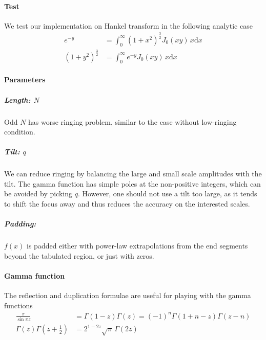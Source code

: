 \documentclass{article}
\renewcommand{\d}{\mathrm{d}}
\begin{document}
\paragraph{Test}
We test our implementation on Hankel transform in the following analytic case
\begin{align}
    e^{-y} &= \int_0^\infty (1+x^2)^\frac32 J_0(xy) \,x\d x  \\
    (1+y^2)^\frac32 &= \int_0^\infty e^{-y} J_0(xy) \,x\d x
\end{align}


\paragraph{Parameters}


\subparagraph{Length: $N$}
Odd $N$ has worse ringing problem, similar to the case without low-ringing condition.


\subparagraph{Tilt: $q$}
We can reduce ringing by balancing the large and small scale amplitudes with the tilt.
The gamma function has simple poles at the non-positive integers,
which can be avoided by picking $q$.
However, one should not use a tilt too large, as it tends to shift the focus away
and thus reduces the accuracy on the interested scales.


\subparagraph{Padding:}
$f(x)$ is padded either with power-law extrapolations from the end segments
beyond the tabulated region, or just with zeros.


\paragraph{Gamma function}
The reflection and duplication formulae are useful for playing with the gamma functions
\begin{align}
    \frac\pi{\sin\pi z} &= \Gamma(1-z)\Gamma(z) = (-1)^n\Gamma(1+n-z)\Gamma(z-n)  \\
    \Gamma(z)\Gamma(z+\tfrac12) &= 2^{1-2z}\sqrt\pi\,\Gamma(2z)
\end{align}




\end{document}
